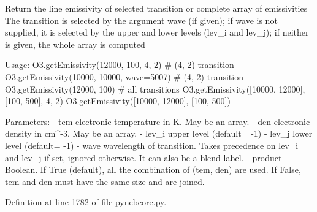 \begin{DoxyVerb}Return the line emissivity of selected transition or complete array of emissivities
The transition is selected by the argument wave (if given); 
if wave is not supplied, it is selected by the upper and lower levels (lev_i and lev_j); 
if neither is given, the whole array is computed

Usage:      
    O3.getEmissivity(12000, 100, 4, 2)         # (4, 2) transition
    O3.getEmissivity(10000, 10000, wave=5007)  # (4, 2) transition
    O3.getEmissivity(12000, 100)               # all transitions
    O3.getEmissivity([10000, 12000], [100, 500], 4, 2)
    O3.getEmissivity([10000, 12000], [100, 500])
    
Parameters:
    - tem      electronic temperature in K. May be an array.
    - den      electronic density in cm^-3. May be an array.
    - lev_i    upper level (default= -1)
    - lev_j    lower level (default= -1)
    - wave     wavelength of transition. Takes precedence on lev_i and lev_j if set, 
        ignored otherwise. It can also be a blend label.
    - product  Boolean. If True (default), all the combination of (tem, den) are used. 
         If False, tem and den must have the same size and are joined.\end{DoxyVerb}
 

Definition at line \hyperlink{pynebcore_8py_source_l01782}{1782} of file \hyperlink{pynebcore_8py_source}{pynebcore.\-py}.



